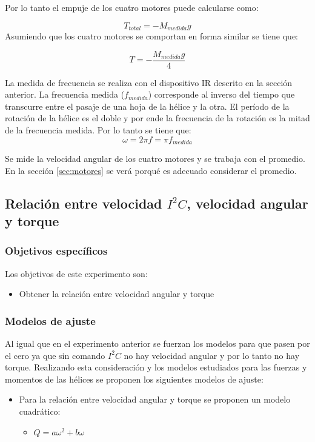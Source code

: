 \documentclass[main]{subfiles}
\begin{document}
Por lo tanto el empuje de los cuatro motores puede calcularse como:

$$
T_{total}=-M_{medida}g
$$
Asumiendo que los cuatro motores se comportan en forma similar se tiene que:

$$
T=-\frac{M_{medida}g}{4}
$$

La medida de frecuencia se realiza con el dispositivo IR descrito en la secci\'on anterior. La frecuencia medida ($f_{medida}$) corresponde al inverso del tiempo que transcurre entre el pasaje de una hoja de la h\'elice y la otra. El per\'iodo de la rotaci\'on de la h\'elice es el doble y por ende la frecuencia de la rotaci\'on es la mitad de la frecuencia medida. Por lo tanto se tiene que:
$$
\omega=2\pi f=\pi f_{medida}
$$

Se mide la velocidad angular de los cuatro motores y se trabaja con el promedio. En la secci\'on \ref{sec:motores} se ver\'a porqu\'e es adecuado considerar el promedio.

\subsection{Relaci\'on entre velocidad $I^2C$, velocidad angular y torque}

\subsubsection*{Objetivos espec\'ificos}
Los objetivos de este experimento son:

\begin{itemize}
\item Obtener la relaci\'on entre velocidad angular y torque
\end{itemize}


\subsubsection*{Modelos de ajuste}
Al igual que en el experimento anterior se fuerzan los modelos para que pasen por el cero ya que sin comando $I^2C$ no hay velocidad angular y por lo tanto no hay torque. Realizando esta consideraci\'on y los modelos estudiados para las fuerzas y momentos de las h\'elices se proponen los siguientes modelos de ajuste:

\begin{itemize}
\item Para la relaci\'on entre velocidad angular y torque se proponen un modelo cuadr\'atico:
	\begin{itemize}
	\item $Q=a\omega^2+b\omega$
	\end{itemize}
\end{itemize}
\end{document}
